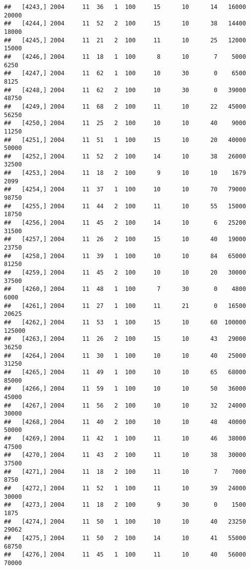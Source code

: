 \documentclass{article}\usepackage[]{graphicx}\usepackage[]{color}
\makeatletter
\newenvironment{kframe}{%
 \def\at@end@of@kframe{}%
 \ifinner\ifhmode%
  \def\at@end@of@kframe{\end{minipage}}%
  \begin{minipage}{\columnwidth}%
 \fi\fi%
 \def\FrameCommand##1{\hskip\@totalleftmargin \hskip-\fboxsep
 \colorbox{shadecolor}{##1}\hskip-\fboxsep
     \hskip-\linewidth \hskip-\@totalleftmargin \hskip\columnwidth}%
 \MakeFramed {\advance\hsize-\width
   \@totalleftmargin\z@ \linewidth\hsize
   \@setminipage}}%
 {\par\unskip\endMakeFramed%
 \at@end@of@kframe}
\newenvironment{knitrout}{}{} %
\makeatother
\begin{document}
\begin{knitrout}
\begin{kframe}
\begin{verbatim}
##   [4243,] 2004     11  36   1  100     15      10      14   16000   20000
##   [4244,] 2004     11  52   2  100     15      10      38   14400   18000
##   [4245,] 2004     11  21   2  100     11      10      25   12000   15000
##   [4246,] 2004     11  18   1  100      8      10       7    5000    6250
##   [4247,] 2004     11  62   1  100     10      30       0    6500    8125
##   [4248,] 2004     11  62   2  100     10      30       0   39000   48750
##   [4249,] 2004     11  68   2  100     11      10      22   45000   56250
##   [4250,] 2004     11  25   2  100     10      10      40    9000   11250
##   [4251,] 2004     11  51   1  100     15      10      20   40000   50000
##   [4252,] 2004     11  52   2  100     14      10      38   26000   32500
##   [4253,] 2004     11  18   2  100      9      10      10    1679    2099
##   [4254,] 2004     11  37   1  100     10      10      70   79000   98750
##   [4255,] 2004     11  44   2  100     11      10      55   15000   18750
##   [4256,] 2004     11  45   2  100     14      10       6   25200   31500
##   [4257,] 2004     11  26   2  100     15      10      40   19000   23750
##   [4258,] 2004     11  39   1  100     10      10      84   65000   81250
##   [4259,] 2004     11  45   2  100     10      10      20   30000   37500
##   [4260,] 2004     11  48   1  100      7      30       0    4800    6000
##   [4261,] 2004     11  27   1  100     11      21       0   16500   20625
##   [4262,] 2004     11  53   1  100     15      10      60  100000  125000
##   [4263,] 2004     11  26   2  100     15      10      43   29000   36250
##   [4264,] 2004     11  30   1  100     10      10      40   25000   31250
##   [4265,] 2004     11  49   1  100     10      10      65   68000   85000
##   [4266,] 2004     11  59   1  100     10      10      50   36000   45000
##   [4267,] 2004     11  56   2  100     10      10      32   24000   30000
##   [4268,] 2004     11  40   2  100     10      10      48   40000   50000
##   [4269,] 2004     11  42   1  100     11      10      46   38000   47500
##   [4270,] 2004     11  43   2  100     11      10      38   30000   37500
##   [4271,] 2004     11  18   2  100     11      10       7    7000    8750
##   [4272,] 2004     11  52   1  100     11      10      39   24000   30000
##   [4273,] 2004     11  18   2  100      9      30       0    1500    1875
##   [4274,] 2004     11  50   1  100     10      10      40   23250   29062
##   [4275,] 2004     11  50   2  100     14      10      41   55000   68750
##   [4276,] 2004     11  45   1  100     11      10      40   56000   70000

\end{verbatim}
\end{kframe}
\end{knitrout}
\end{document}
